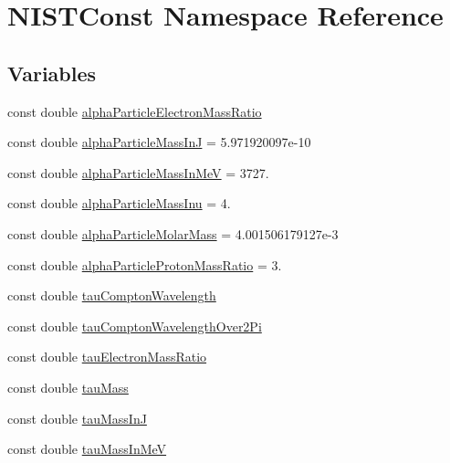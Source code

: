 \hypertarget{namespace_n_i_s_t_const}{}\section{N\+I\+S\+T\+Const Namespace Reference}
\label{namespace_n_i_s_t_const}
\subsection*{Variables}
\begin{DoxyCompactItemize}
\item 
const double \hyperlink{namespace_n_i_s_t_const_a9f00b32c60f1bc5b8a950b58e64d08c8}{alpha\+Particle\+Electron\+Mass\+Ratio}
\item 
const double \hyperlink{namespace_n_i_s_t_const_a4a65b49a93c81dff12ac24366f68e4e9}{alpha\+Particle\+Mass\+InJ} = 5.\+971920097e-\/10
\item 
const double \hyperlink{namespace_n_i_s_t_const_a8dd1d38f58ef9d77f39c26be9bb849e0}{alpha\+Particle\+Mass\+In\+MeV} = 3727.
\item 
const double \hyperlink{namespace_n_i_s_t_const_a1233ffb0d6537e112ce39623e6c6d0d5}{alpha\+Particle\+Mass\+Inu} = 4.
\item 
const double \hyperlink{namespace_n_i_s_t_const_a06d92f78de04d4e1d79b8468b04959ef}{alpha\+Particle\+Molar\+Mass} = 4.\+001506179127e-\/3
\item 
const double \hyperlink{namespace_n_i_s_t_const_a4629465057dc35ad7eecca610bcbd092}{alpha\+Particle\+Proton\+Mass\+Ratio} = 3.
\item 
const double \hyperlink{namespace_n_i_s_t_const_a02608ef1c26b9550ee7547350bbcdd5d}{tau\+Compton\+Wavelength}
\item 
const double \hyperlink{namespace_n_i_s_t_const_a3cca663c9ba88e04346cbd29643aba14}{tau\+Compton\+Wavelength\+Over2\+Pi}
\item 
const double \hyperlink{namespace_n_i_s_t_const_a58efae35c13c681c03e115a97659063a}{tau\+Electron\+Mass\+Ratio}
\item 
const double \hyperlink{namespace_n_i_s_t_const_abb1b68dd381ed2582050fd991f210be8}{tau\+Mass}
\item 
const double \hyperlink{namespace_n_i_s_t_const_a16b85e377d419016e21dc80e464d811c}{tau\+Mass\+InJ}
\item 
const double \hyperlink{namespace_n_i_s_t_const_a9959b7d66d60226941c2d2658606a4e2}{tau\+Mass\+In\+MeV}
\item 

\end{DoxyCompactItemize}

